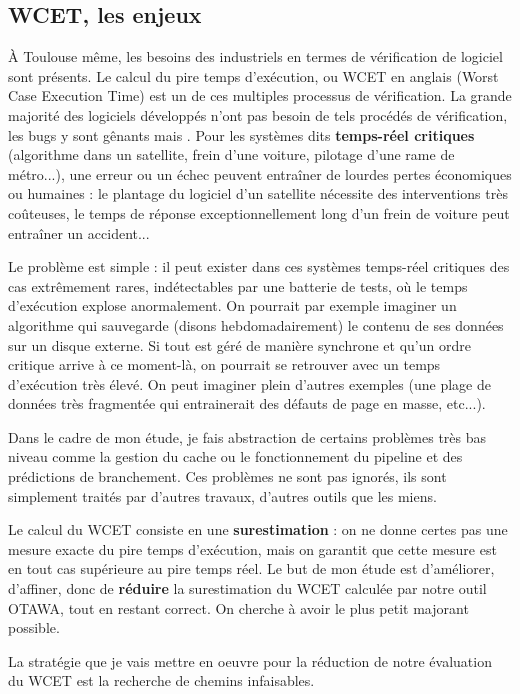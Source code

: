 \documentclass[french]{article}
\newcommand\ccc[1]{\color{red}{#1}\color{black}}
\begin{document}
  \subsection{WCET, les enjeux}
  \`A Toulouse même, les besoins des industriels en termes de vérification de logiciel sont présents. Le calcul du pire temps d'exécution, ou WCET en anglais (Worst Case Execution Time) est un de ces multiples processus de vérification. La grande majorité des logiciels développés n'ont pas besoin de tels procédés de vérification, les bugs y sont gênants mais \ccc{la plupart du temps un simple redémarrage suffit}. Pour les systèmes dits \textbf{temps-réel critiques} (algorithme dans un satellite, frein d'une voiture, pilotage d'une rame de métro...), une erreur ou un échec peuvent entraîner de lourdes pertes économiques ou humaines : le plantage du logiciel d'un satellite nécessite des interventions très coûteuses, le temps de réponse exceptionnellement long d'un frein de voiture peut entraîner un accident...

  Le problème est simple : il peut exister dans ces systèmes temps-réel critiques des cas extrêmement rares, indétectables par une batterie de tests, où le temps d'exécution explose anormalement. On pourrait par exemple imaginer un algorithme qui sauvegarde (disons hebdomadairement) le contenu de ses données sur un disque externe. Si tout est géré de manière synchrone et qu'un ordre critique arrive à ce moment-là, on pourrait se retrouver avec un temps d'exécution très élevé. On peut imaginer plein d'autres exemples (une plage de données très fragmentée qui entrainerait des défauts de page en masse, etc...).

  Dans le cadre de mon étude, je fais abstraction de certains problèmes très bas niveau comme la gestion du cache ou le fonctionnement du pipeline et des prédictions de branchement. Ces problèmes ne sont pas ignorés, ils sont simplement traités par d'autres travaux, d'autres outils que les miens.

  Le calcul du WCET consiste en une \textbf{surestimation} : on ne donne certes pas une mesure exacte du pire temps d'exécution, mais on garantit que cette mesure est en tout cas supérieure au pire temps réel. Le but de mon étude est d'améliorer, d'affiner, donc de \textbf{réduire} la surestimation du WCET calculée par notre outil OTAWA, tout en restant correct. On cherche à avoir le plus petit majorant possible.

  La stratégie que je vais mettre en oeuvre pour la réduction de notre évaluation du WCET est la recherche de chemins infaisables.
\end{document}
